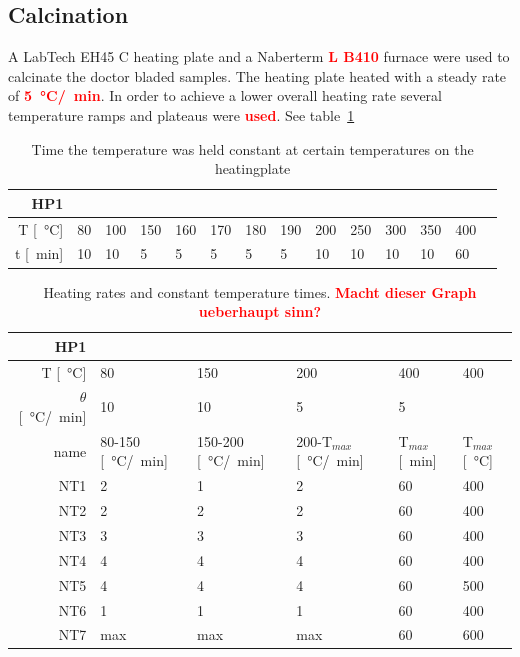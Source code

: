 \documentclass[a4paper]{article}
\newcommand{\todo}[1]{\textbf{\textcolor{red}{#1}}}
\newcommand{\td}[1]{\textbf{\textcolor{red}{#1}}}
\newcommand{\minutes}[1]{\SI{#1}{\minute}}
\newcommand{\oc}[1]{\SI{#1}{\degreeCelsius}}
\begin{document}
\subsection{Calcination}
A LabTech EH45 C heating plate and a Naberterm \td{L B410} furnace were used to calcinate the doctor bladed samples. 
The heating plate heated with a steady rate of \td{\oc{5}/\minutes{}}.
In order to achieve a lower overall heating rate several temperature ramps and plateaus were \todo{used}. See table~\ref{tab:labtech}


\begin{table}[h]
	\centering
	\begin{tabular}{rl ll ll ll ll ll ll }%
		HP1		&&&&&&&&&&&&&\\
		\hline
		T [\oc{}]	    &80		&100	&150	&160	&170 	&180	&190	&200	&250	&300	&350	&400	\\
		t [\minutes{}]	&10 	&10		&5 		&5 		&5 		&5 &5 &10 &10 &10 &10 &60 \\
		\hline
	\end{tabular}
	\caption{Time the temperature was held constant at certain temperatures on the heatingplate}
	\label{tab:labtech}
\end{table}


\begin{table}[h]
	\centering
	\begin{tabular}{rl ll ll}%
		HP1		&&&&&\\%
		\hline
		T [\oc{}]				&80		&150	&200	&400	&400 	\\
		$\theta$ [\oc{}/\minutes{}]	&10 	&10		&5 		&5		& 		\\
		\hline
		name	&80-150 [\oc{}/\minutes{}]	&150-200 [\oc{}/\minutes{}]	&200-T$_{max}$ [\oc{}/\minutes{}]	&T$_{max}$ [\minutes{}]	&T$_{max}$ [\oc{}] \\
		NT1		&2					&1					&2					&60 &400 \\
		NT2		&2					&2					&2					&60 &400 \\
		NT3		&3					&3					&3					&60 &400 \\
		NT4		&4					&4					&4					&60 &400 \\
		NT5		&4					&4					&4					&60 &500 \\
		NT6		&1					&1					&1					&60 &400 \\
		NT7		&max				&max				&max				&60 &600 \\
		\hline
	\end{tabular}
	\caption{Heating rates and constant temperature times. \td{Macht dieser Graph ueberhaupt sinn? }}
	\label{tab:nt}
\end{table}
\end{document}
